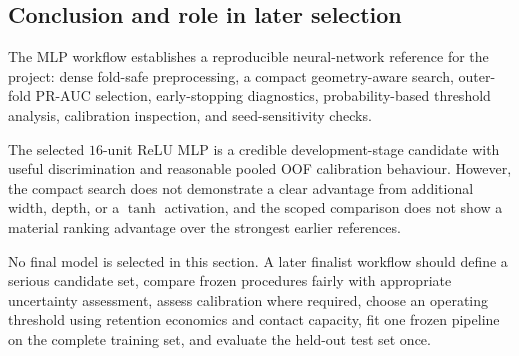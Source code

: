 \subsection{Conclusion and role in later selection}

The MLP workflow establishes a reproducible neural-network reference for the project: dense fold-safe preprocessing, a compact geometry-aware search, outer-fold PR-AUC selection, early-stopping diagnostics, probability-based threshold analysis, calibration inspection, and seed-sensitivity checks.

The selected \(16\)-unit ReLU MLP is a credible development-stage candidate with useful discrimination and reasonable pooled OOF calibration behaviour. However, the compact search does not demonstrate a clear advantage from additional width, depth, or a \(\tanh\) activation, and the scoped comparison does not show a material ranking advantage over the strongest earlier references.

No final model is selected in this section. A later finalist workflow should define a serious candidate set, compare frozen procedures fairly with appropriate uncertainty assessment, assess calibration where required, choose an operating threshold using retention economics and contact capacity, fit one frozen pipeline on the complete training set, and evaluate the held-out test set once.
